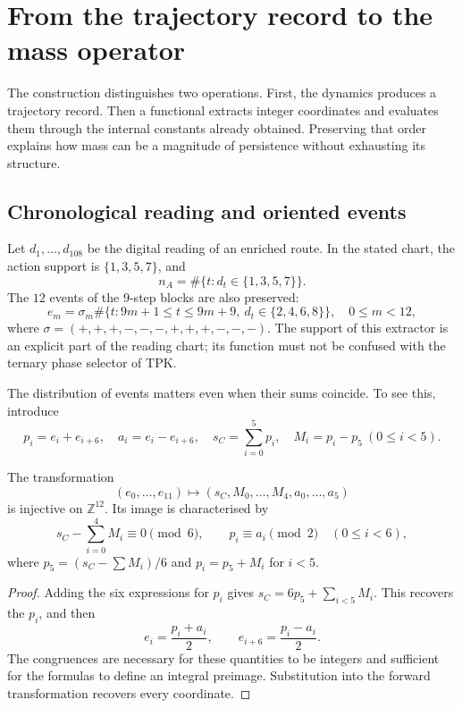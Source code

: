 \section{From the trajectory record to the mass operator}
\label{vi:sec:operador-masa}

The construction distinguishes two operations. First, the dynamics produces
a trajectory record. Then a functional extracts integer
coordinates and evaluates them through the internal constants already obtained.
Preserving that order explains how mass can be a magnitude of
persistence without exhausting its structure.

\subsection{Chronological reading and oriented events}

Let \(d_1,\ldots,d_{108}\) be the digital reading of an enriched route.
In the stated chart, the action support is \(\{1,3,5,7\}\), and
\[
 n_A=\#\{t:d_t\in\{1,3,5,7\}\}.
\]
The \(12\) events of the \(9\)-step blocks are also preserved:
\[
 e_m=\sigma_m\#\{t:9m+1\le t\le9m+9,\ d_t\in\{2,4,6,8\}\},
 \quad 0\le m<12,
\]
where \(\sigma=(+,+,+,-,-,-,+,+,+,-,-,-)\). The support of this
extractor is an explicit part of the reading chart; its function must
not be confused with the ternary phase selector of TPK.

The distribution of events matters even when their sums
coincide. To see this, introduce
\[
 p_i=e_i+e_{i+6},\quad a_i=e_i-e_{i+6},\quad
 s_C=\sum_{i=0}^{5}p_i,\quad M_i=p_i-p_5\ (0\le i<5).
\]

\begin{proposition}
\label{vi:prop:eventos}
The transformation
\[
(e_0,\ldots,e_{11})\mapsto(s_C,M_0,\ldots,M_4,a_0,\ldots,a_5)
\]
is injective on \(\mathbb Z^{12}\). Its image is characterised by
\[
 s_C-\sum_{i=0}^4M_i\equiv0\pmod6,
 \qquad p_i\equiv a_i\pmod2\quad(0\le i<6),
\]
where \(p_5=(s_C-\sum M_i)/6\) and \(p_i=p_5+M_i\) for \(i<5\).
\end{proposition}
\begin{proof}
Adding the six expressions for \(p_i\) gives
\(s_C=6p_5+\sum_{i<5}M_i\). This recovers the \(p_i\), and then
\[
 e_i=\frac{p_i+a_i}{2},\qquad
 e_{i+6}=\frac{p_i-a_i}{2}.
\]
The congruences are necessary for these quantities to be integers and
sufficient for the formulas to define an integral preimage. Substitution
into the forward transformation recovers every coordinate.
\end{proof}

